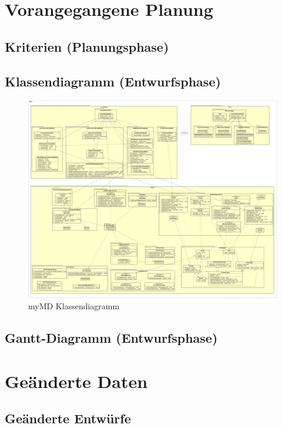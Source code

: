 \documentclass[a4paper]{scrreprt}
\begin{document}
\chapter{Vorangegangene Planung}
\section{Kriterien (Planungsphase)}

\section{Klassendiagramm (Entwurfsphase)}
\begin{figure}
\hspace{-1.8cm}
\begin{minipage}[c]{\textwidth}
\includegraphics[width=1.6\textwidth, angle=90]{graphics/Klassendiagramme/myMD}
\caption{myMD Klassendiagramm}
\end{minipage}
\end{figure}

\section{Gantt-Diagramm (Entwurfsphase)}

\chapter{Geänderte Daten}
\section{Geänderte Entwürfe}
\end{document}

